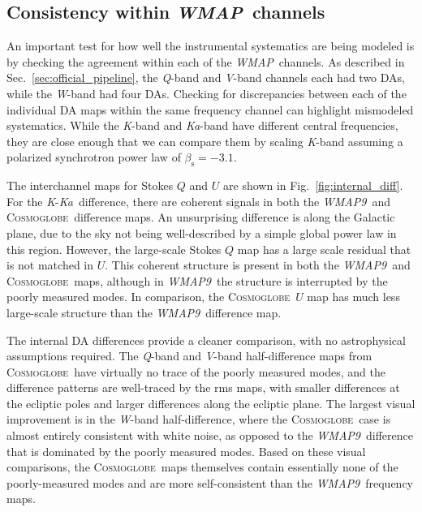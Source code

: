 \documentclass[twocolumn]{../../common/aa}
\def\WMAP{\emph{WMAP}}
\def\WMAPnine{\emph{WMAP9}}
\newcommand{\cosmoglobe}{\textsc{Cosmoglobe}}
\newcommand{\K}[0]{\textit K}
\newcommand{\Ka}[0]{\textit{Ka}}
\newcommand{\Q}[0]{\textit Q}
\newcommand{\V}[0]{\textit V}
\newcommand{\W}[0]{\textit W}
\begin{document}
\subsection{Consistency within \WMAP\ channels}
\label{sec:internal_consistency}

An important test for how well the instrumental systematics are being modeled is by checking the agreement within each of the \WMAP\ channels. As described in Sec.~\ref{sec:official_pipeline}, the \Q-band and \V-band channels each had two DAs, while the \W-band had four DAs. Checking for discrepancies between each of the individual DA maps within the same frequency channel can highlight mismodeled systematics. While the \K-band and \Ka-band have different central frequencies, they are close enough that we can compare them by scaling \K-band assuming a polarized synchrotron power law of $\beta_\mathrm s=-3.1$.

The interchannel maps for Stokes $Q$ and $U$ are shown in Fig.~\ref{fig:internal_diff}. 
For the \K-\Ka\ difference, there are coherent signals in both the \WMAPnine\ and \cosmoglobe\ difference maps. An unsurprising difference is along the Galactic plane, due to the sky not being well-described by a simple global power law in this region. However, the large-scale Stokes $Q$ map has a large scale residual that is not matched in $U$. This coherent structure is present in both the \WMAPnine\ and \cosmoglobe\ maps, although in \WMAPnine\ the structure is interrupted by the poorly measured modes. In comparison, the \cosmoglobe\ $U$ map has much less large-scale structure than the \WMAPnine\ difference map.

The internal DA differences provide a cleaner comparison, with no astrophysical assumptions required. The \Q-band and \V-band half-difference maps from \cosmoglobe\ have virtually no trace of the poorly measured modes, and the difference patterns are well-traced by the rms maps, with smaller differences at the ecliptic poles and larger differences along the ecliptic plane. The largest visual improvement is in the \W-band half-difference, where the \cosmoglobe\ case is almost entirely consistent with white noise, as opposed to the \WMAPnine\ difference that is dominated by the poorly measured modes.  Based on these visual comparisons, the \cosmoglobe\ maps themselves contain essentially none of the poorly-measured modes and are more self-consistent than the \WMAPnine\ frequency maps.
\end{document}

